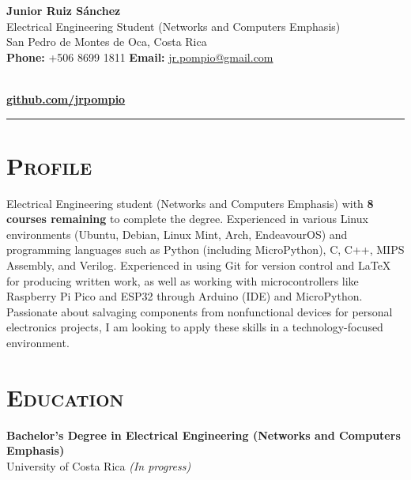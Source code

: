 \documentclass[a4paper,9pt]{article}
\begin{document}
\begin{minipage}[t]{0.65\textwidth}
    \Large \textbf{Junior Ruiz Sánchez} \\
    \small
    Electrical Engineering Student (Networks and Computers Emphasis) \\
    San Pedro de Montes de Oca, Costa Rica \\
    \textbf{Phone:} +506 8699 1811 \quad
    \textbf{Email:} \href{mailto:jr.pompio@gmail.com}{jr.pompio@gmail.com}
\end{minipage}
\hfill
\begin{minipage}[t]{0.3\textwidth}
    \raggedleft
    \\
    \footnotesize \textbf{\href{https://github.com/jrpompio}{github.com/jrpompio}}
\end{minipage}

\vspace{0.5em}
\hrule
\vspace{0.8em}

\section*{\textsc{Profile}}
\small
Electrical Engineering student (Networks and Computers Emphasis) with \textbf{8 courses remaining} to complete the degree. Experienced in various Linux environments (Ubuntu, Debian, Linux Mint, Arch, EndeavourOS) and programming languages such as Python (including MicroPython), C, C++, MIPS Assembly, and Verilog. Experienced in using Git for version control and LaTeX for producing written work, as well as working with microcontrollers like Raspberry Pi Pico and ESP32 through Arduino (IDE) and MicroPython. Passionate about salvaging components from nonfunctional devices for personal electronics projects, I am looking to apply these skills in a technology-focused environment.

\section*{\textsc{Education}}
\small
\textbf{Bachelor's Degree in Electrical Engineering (Networks and Computers Emphasis)} \\
University of Costa Rica \textit{(In progress)}
\end{document}
